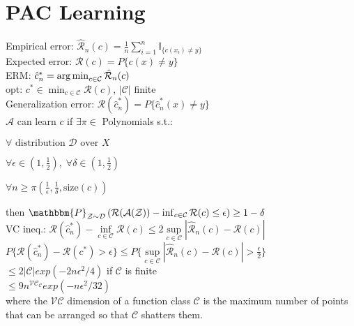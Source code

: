 \section{PAC Learning}
Empirical error: $\hat{\mathcal{R}}_n(c) = \tfrac{1}{n}\sum_{i=1}^n \mathbb{I}_{\{c(x_i)\neq y\}}$ \\
Expected error: $\mathcal{R}(c) = P\{c(x)\neq y\}$ \\
ERM: $\hat{c}_n^* = \operatorname*{arg\,min}_{c\in\mathcal{C}} \hat{\mathcal{R}}_n(c)$ \\
opt: $c^* \in \min_{c\in\mathcal{C}} \mathcal{R}(c)$, $|\mathcal{C}|$ finite \\
Generalization error: $\mathcal{R}(\hat{c}_n^*) = P\{ \hat{c}_n^*(x)\neq y \}$ \\
$\mathcal{A}$ can learn $c$ if $\exists \pi \in$ Polynomials s.t.:\\
\begin{inparaitem}[\color{red}\textbullet]
    \item $\forall \text{ distribution } \mathcal{D} \text{ over } X$ \\
    \item $\forall \epsilon \in (1, \frac{1}{2}),\;\forall \delta \in (1, \frac{1}{2})$ \\
    \item $\forall n \geq \pi(\frac{1}{\epsilon}, \frac{1}{\delta}, \text{size}(c))$\\
\end{inparaitem}
then $\mathbbm{P}_{\mathcal{Z}\sim\mathcal{D}}\left(\mathcal{R}(\mathcal{A}(\mathcal{Z}))- \inf_{c\in \mathcal{C}}\mathcal{R}(c)\leq \epsilon\right)\geq 1-\delta$\\

VC ineq.: $\mathcal{R}(\hat{c}_n^*) - \inf\limits_{c\in\mathcal{C}}\mathcal{R}(c) \leq 2\sup\limits_{c\in\mathcal{C}}|\hat{\mathcal{R}}_n(c) - \mathcal{R}(c)|$ \\ 
$P\{ \mathcal{R}(\hat{c}_n^*) - \mathcal{R}(c^*) > \epsilon \} \leq P\{ \sup\limits_{c\in\mathcal{C}}|\hat{\mathcal{R}}_n(c) - \mathcal{R}(c)| > \frac{\epsilon}{2} \} $\\
$\leq 2|\mathcal{C}| exp(-2n\epsilon ^2 /4) $ if $\mathcal{C}$ is finite\\
$\leq 9n^{\mathcal{VC}_{\mathcal{C}}}exp(-n\epsilon ^{2} /32)$ \\
where the $\mathcal{VC}$ dimension of a function class $\mathcal{C}$ 
is the maximum number of points that can be arranged so that $\mathcal{C}$ shatters them.
